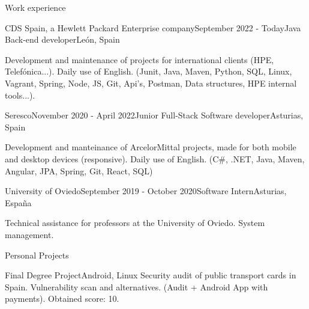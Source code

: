 \documentclass{resume} %
\begin{document}

\begin{rSection}{Work experience}

\begin{rSubsection}{CDS Spain, a Hewlett Packard Enterprise company}{September 2022 - Today}{Java Back-end developer}{León, Spain}
\item Development and maintenance of projects for international clients (HPE, Telefónica...). Daily use of English. (Junit, Java, Maven, Python, SQL, Linux, Vagrant, Spring, Node, JS, Git, Api's, Postman, Data structures, HPE internal tools...).
\end{rSubsection}

\begin{rSubsection}{Seresco}{November 2020 - April 2022}{Junior Full-Stack Software developer}{Asturias, Spain}
\item Development and manteinance of ArcelorMittal projects, made for both mobile and desktop devices (responsive). Daily use of English. (C\#, .NET, Java, Maven, Angular, JPA, Spring, Git, React, SQL)
\end{rSubsection}

\begin{rSubsection}{University of Oviedo}{September 2019 - October 2020}{Software Intern}{Asturias, España}
\item Technical assistance for professors at the University of Oviedo. System management.
\end{rSubsection}

\end{rSection}


\begin{rSection}{Personal Projects}
\begin{rSubsection}{{Final Degree Project}}{Android, Linux}{}{}
Security audit of public transport cards in Spain. Vulnerability scan and alternatives. (Audit + Android App with payments).
Obtained score: 10.
\end{rSubsection}
\end{rSection}
\end{document}
